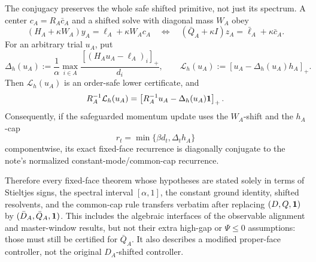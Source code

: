 \begin{proposition}
The conjugacy preserves the whole safe shifted primitive, not just its
spectrum.  A center \(c_A=R_A\bar c_A\) and a shifted solve with diagonal
mass \(W_A\) obey
\begin{equation}
 (H_A+\kappa W_A)y_A=\ell_A+\kappa W_Ac_A
 \quad\Longleftrightarrow\quad
 (\bar Q_A+\kappa I)z_A=\bar\ell_A+\kappa\bar c_A.
 \label{eq:aesp-cd-proper-face-shift-conjugacy}
\end{equation}
For an arbitrary trial \(u_A\), put
\begin{equation}
 \Delta_h(u_A)
 :=\frac1\alpha
   \max_{i\in A}\frac{[(H_Au_A-\ell_A)_i]_+}{d_i},
 \qquad
 \mathcal L_h(u_A):=[u_A-\Delta_h(u_A)h_A]_+.
 \label{eq:aesp-cd-proper-face-h-cap}
\end{equation}
Then \(\mathcal L_h(u_A)\) is an order-safe lower certificate, and
\begin{equation*}
 R_A^{-1}\mathcal L_h(u_A)
 =\left[R_A^{-1}u_A-\Delta_h(u_A)\mathbf{1}\right]_+.
\end{equation*}
Consequently, if the safeguarded momentum update uses the \(W_A\)-shift and
the \(h_A\)-cap
\begin{equation*}
 r_t=\min\{\beta d_t,\Delta_t h_A\}
 \end{equation*}
componentwise, its exact fixed-face recurrence is diagonally conjugate to
the note's normalized constant-mode/common-cap recurrence.

Therefore every fixed-face theorem whose hypotheses are stated solely in
terms of Stieltjes signs, the spectral interval \([\alpha,1]\), the constant
ground identity, shifted resolvents, and the common-cap rule transfers
verbatim after replacing \((D,Q,\mathbf{1})\) by
\((\bar D_A,\bar Q_A,\mathbf{1})\).  This includes the algebraic interfaces of the
observable alignment and master-window results, but not their extra high-gap
or \(\Psi\leq0\) assumptions: those must still be certified for
\(\bar Q_A\).  It also describes a modified proper-face controller, not the
original \(D_A\)-shifted controller.
\end{proposition}

